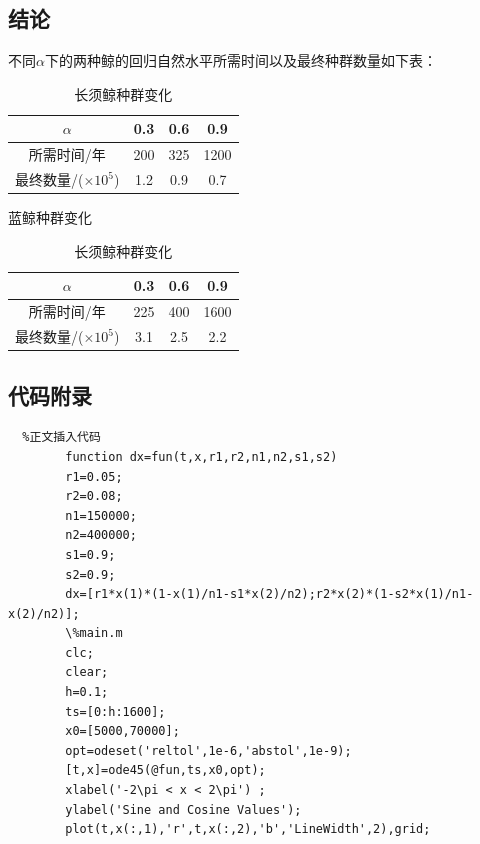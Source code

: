 \documentclass[UTF8]{ctexart}
\begin{document}
    \subsection{结论}
    不同$\alpha$下的两种鲸的回归自然水平所需时间以及最终种群数量如下表：
    \begin{table}[!htbp]
        \centering
           
                \begin{tabular}{cccc}
                    \toprule
            $\alpha$ & 0.3& 0.6& 0.9\\
                    \midrule
            所需时间/年 & 200 & 325 & 1200\\
            最终数量/($\times 10^5$) & 1.2 & 0.9 & 0.7\\
                    \bottomrule
                    
                \end{tabular}
                \caption{蓝鲸种群变化}
               
            
            
                \begin{tabular}{cccc}
                    \toprule
            $\alpha$ & 0.3& 0.6& 0.9\\
                    \midrule
            所需时间/年 & 225 & 400 & 1600\\
            最终数量/($\times 10^5$) & 3.1 & 2.5 & 2.2\\
                    \bottomrule
                \end{tabular}
                \caption{长须鲸种群变化}
    \end{table}  

    \subsection{代码附录}
    
    \begin{lstlisting}	%正文插入代码
        function dx=fun(t,x,r1,r2,n1,n2,s1,s2)
        r1=0.05;
        r2=0.08;
        n1=150000;
        n2=400000;
        s1=0.9;
        s2=0.9;
        dx=[r1*x(1)*(1-x(1)/n1-s1*x(2)/n2);r2*x(2)*(1-s2*x(1)/n1-x(2)/n2)];
        \%main.m
        clc;
        clear;
        h=0.1;
        ts=[0:h:1600];
        x0=[5000,70000];
        opt=odeset('reltol',1e-6,'abstol',1e-9);
        [t,x]=ode45(@fun,ts,x0,opt);
        xlabel('-2\pi < x < 2\pi') ;
        ylabel('Sine and Cosine Values');
        plot(t,x(:,1),'r',t,x(:,2),'b','LineWidth',2),grid;
    \end{lstlisting}
\end{document}
